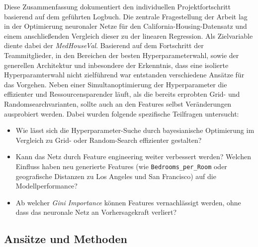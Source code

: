 \documentclass[9pt,a4paper,twocolumn,twoside]{tau-class/tau}
\begin{document}
Diese Zusammenfassung dokumentiert den individuellen Projektfortschritt basierend auf dem geführten Logbuch.
Die zentrale Fragestellung der Arbeit lag in der Optimierung neuronaler Netze für den California-Housing-Datensatz und einem anschließenden Vergleich dieser zu der linearen Regression.
Als Zielvariable diente dabei der \textit{MedHouseVal}.
Basierend auf dem Fortschritt der Teammitglieder, in den Bereichen der besten Hyperparameterwahl, sowie der generellen Architektur und
inbesondere der Erkenntnis, dass eine isolierte Hyperparamterwahl nicht zielführend war entstanden verschiedene Ansätze für das Vorgehen.
Neben einer Simultanoptimierung der Hyperparameter die effizienter und Ressourcensparender läuft,
als die bereits erprobten Grid- und Randomsearchvarianten, sollte auch an den Features selbst Veränderungen ausprobiert werden. 
Dabei wurden folgende spezifische Teilfragen untersucht:
\begin{itemize}
    \item Wie lässt sich die Hyperparameter-Suche durch bayesianische Optimierung im Vergleich zu Grid- oder Random-Search effizienter gestalten?
    \item Kann das Netz durch Feature engineering weiter verbessert werden? Welchen Einfluss haben neu generierte Features (wie \texttt{Bedrooms\_per\_Room} oder geografische Distanzen zu Los Angeles und San Francisco) auf die Modellperformance?
    \item Ab welcher \textit{Gini Importance} können Features vernachlässigt werden, ohne dass das neuronale Netz an Vorhersagekraft verliert?
\end{itemize}

\subsection{Ansätze und Methoden}
\end{document}

